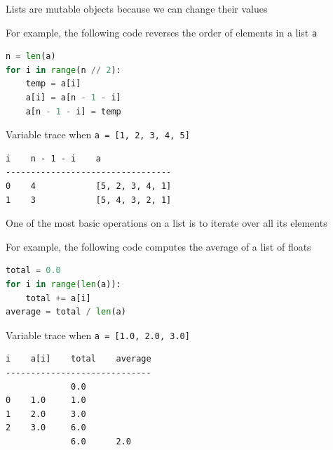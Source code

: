 \documentclass[8pt,a4paper,compress]{beamer}
\begin{document}
\begin{frame}[fragile]
\pause

Lists are mutable objects because we can change their values

\pause\bigskip

For example, the following code reverses the order of elements in a list \lstinline{a}

\smallskip

\begin{lstlisting}[language=Python,style=focusin]
n = len(a)
for i in range(n // 2):
    temp = a[i]
    a[i] = a[n - 1 - i]
    a[n - 1 - i] = temp
\end{lstlisting}

\pause\smallskip

Variable trace when \lstinline{a = [1, 2, 3, 4, 5]}

\smallskip

\begin{lstlisting}[language={},style=focusin]
i    n - 1 - i    a
---------------------------------
0    4            [5, 2, 3, 4, 1]
1    3            [5, 4, 3, 2, 1]
\end{lstlisting} 

\pause\bigskip

One of the most basic operations on a list is to iterate over all its elements

\pause\bigskip

For example, the following code computes the average of a list of floats

\smallskip

\begin{lstlisting}[language=Python,style=focusin]
total = 0.0
for i in range(len(a)):
    total += a[i]
average = total / len(a)
\end{lstlisting}

\pause\smallskip

Variable trace when \lstinline{a = [1.0, 2.0, 3.0]}
\begin{lstlisting}[language={},style=focusin]
i    a[i]    total    average
-----------------------------
             0.0
0    1.0     1.0
1    2.0     3.0
2    3.0     6.0
             6.0      2.0
\end{lstlisting} 
\end{frame}
\end{document}
